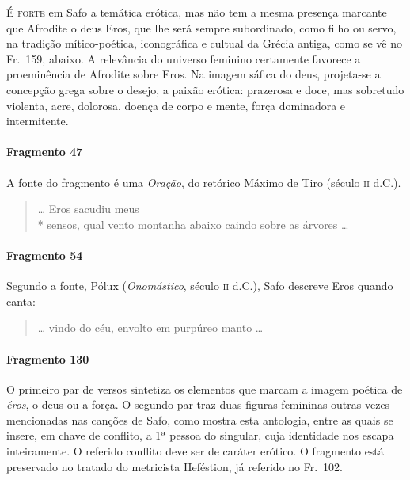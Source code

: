\textsc{É forte} em Safo a temática erótica, mas não tem a mesma presença marcante que
Afrodite o deus Eros, que lhe será sempre subordinado, como filho ou servo, na
tradição mítico-poética, iconográfica e cultual da Grécia antiga, como se vê no
Fr.~159, abaixo. A relevância do universo feminino certamente favorece a
proeminência de Afrodite sobre Eros. Na imagem sáfica do deus, projeta-se a
concepção grega sobre o desejo, a paixão erótica: prazerosa e doce, mas
sobretudo violenta, acre, dolorosa, doença de corpo e mente, força dominadora e
intermitente.

\paragraph{Fragmento 47}

{\small A fonte do fragmento é uma \textit{Oração}, do retórico Máximo de Tiro (século
\textsc{ii} d.C.).}

\begin{verse}
\ldots{} Eros sacudiu meus\\*
sensos, qual vento montanha abaixo caindo sobre as árvores \ldots{}
\end{verse}

\paragraph{Fragmento 54}

{\small Segundo a fonte, Pólux (\textit{Onomástico}, século \textsc{ii} d.C.), Safo descreve Eros
quando canta:}

\begin{verse}
\ldots{} vindo do céu, envolto em purpúreo manto \ldots{}
\end{verse}

\paragraph{Fragmento 130}

{\small O primeiro par de versos sintetiza os elementos que marcam a imagem poética de
\textit{éros}, o deus ou a força. O segundo par traz duas figuras femininas
outras vezes mencionadas nas canções de Safo, como mostra esta antologia, entre
as quais se insere, em chave de conflito, a 1ª pessoa do singular, cuja
identidade nos escapa inteiramente. O referido conflito deve ser de caráter
erótico. O fragmento está preservado no tratado do metricista Heféstion, já
referido no Fr.~102.}

